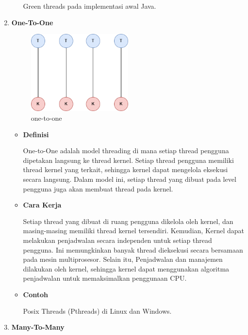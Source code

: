 \documentclass[12pt]{article}
\begin{document}
\begin{enumerate}
\begin{itemize}
        \par \hspace{2em} Green threads pada implementasi awal Java.
    \end{itemize}
    \item\textbf{One-To-One} 
        \begin{figure}[h] 
            \centering 
            \includegraphics[width=0.5\textwidth]{asset/one to one.drawio.png} 
            \caption{one-to-one} 
            \label{fig:contoh} 
        \end{figure}
        \begin{itemize}
        \item\textbf{Definisi}
        \par \hspace{2em} One-to-One adalah model threading di mana setiap thread pengguna dipetakan langsung ke thread kernel. Setiap thread pengguna memiliki thread kernel yang terkait, sehingga kernel dapat mengelola eksekusi secara langsung. Dalam model ini, setiap thread yang dibuat pada level pengguna juga akan membuat thread pada kernel.
        \item\textbf{Cara Kerja}
        \par \hspace{2em} Setiap thread yang dibuat di ruang pengguna dikelola oleh kernel, dan masing-masing memiliki thread kernel tersendiri. Kemudian, Kernel dapat melakukan penjadwalan secara independen untuk setiap thread pengguna. Ini memungkinkan banyak thread dieksekusi secara bersamaan pada mesin multiprosesor. Selain itu, Penjadwalan dan manajemen dilakukan oleh kernel, sehingga kernel dapat menggunakan algoritma penjadwalan untuk memaksimalkan penggunaan CPU.
        \item\textbf{Contoh}
        \par \hspace{2em} Posix Threads (Pthreads) di Linux dan Windows.
    \end{itemize}
    \item\textbf{Many-To-Many}

\end{enumerate}
\end{document}
